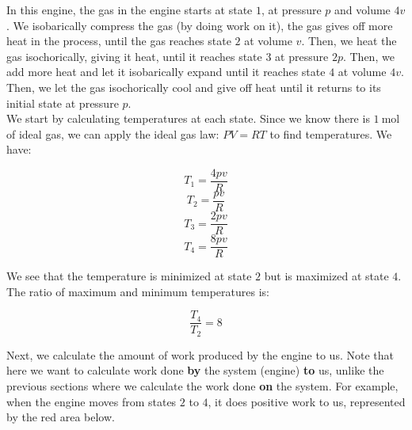 \documentclass[12pt, a4paper]{article}
\newcounter{exa}
\begin{document}
In this engine, the gas in the engine starts at state $1$, at pressure $p$ and volume $4v$. We isobarically compress the gas (by doing work on it), the gas gives off more heat in the process, until the gas reaches state $2$ at volume $v$. Then, we heat the gas isochorically, giving it heat, until it reaches state $3$ at pressure $2p$. Then, we add more heat and let it isobarically expand until it reaches state $4$ at volume $4v$. Then, we let the gas isochorically cool and give off heat until it returns to its initial state at pressure $p$. \\

We start by calculating temperatures at each state. Since we know there is $\SI{1}{\mole}$ of ideal gas, we can apply the ideal gas law: $PV=RT$ to find temperatures. We have:

\[T_1=\frac{4pv}{R}\]
\[T_2=\frac{pv}{R}\]
\[T_3=\frac{2pv}{R}\]
\[T_4=\frac{8pv}{R}\]

We see that the temperature is minimized at state $2$ but is maximized at state $4$. The ratio of maximum and minimum temperatures is:

\[\frac{T_4}{T_2}=8\]

Next, we calculate the amount of work produced by the engine to us. Note that here we want to calculate work done \textbf{by} the system (engine) \textbf{to} us, unlike the previous sections where we calculate the work done \textbf{on} the system. For example, when the engine moves from states $2$ to $4$, it does positive work to us, represented by the red area below.

\begin{center}
\end{center}
\end{document}
